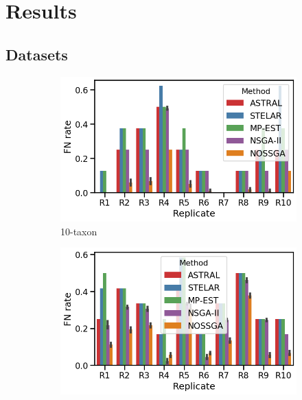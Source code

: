 \section{Results}
\subsection{Datasets}

\begin{figure}[!htbp]
	\centering
	\begin{adjustwidth}{-4.5cm}{}
	\begin{subfigure}[b]{0.5\textwidth}
		\includegraphics[width=\textwidth]{Figure/10-taxon_10_replicates}
		\caption{10-taxon}
	\end{subfigure}%
	\begin{subfigure}[b]{0.5\textwidth}
		\includegraphics[width=\textwidth]{Figure/15-taxon_10_replicates}

\end{subfigure}
\end{adjustwidth}
\end{figure}
